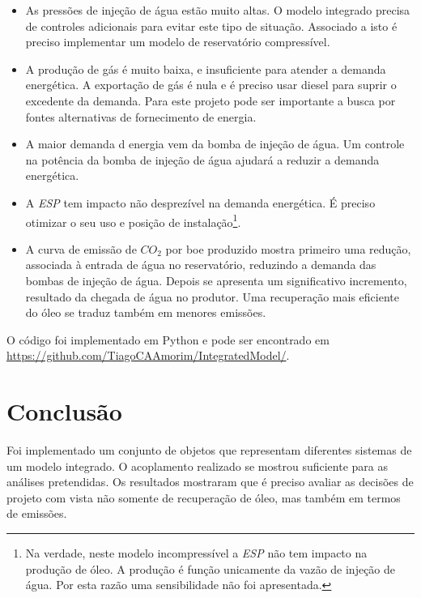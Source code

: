 \documentclass[final,5p]{elsarticle}
\numberwithin{equation}{section}
\begin{document}
        \begin{itemize}
            \item As pressões de injeção de água estão muito altas. O modelo integrado precisa de controles adicionais para evitar este tipo de situação. Associado a isto é preciso implementar um modelo de reservatório compressível.
            \item A produção de gás é muito baixa, e insuficiente para atender a demanda energética. A exportação de gás é nula e é preciso usar diesel para suprir o excedente da demanda. Para este projeto pode ser importante a busca por fontes alternativas de fornecimento de energia.
            \item A maior demanda d energia vem da bomba de injeção de água. Um controle na potência da bomba de injeção de água ajudará a reduzir a demanda energética.
            \item A \emph{ESP} tem impacto não desprezível na demanda energética. É preciso otimizar o seu uso e posição de instalação\footnote{Na verdade, neste modelo incompressível a \emph{ESP} não tem impacto na produção de óleo. A produção é função unicamente da vazão de injeção de água. Por esta razão uma sensibilidade não foi apresentada.}.
            \item A curva de emissão de $CO_2$ por boe produzido mostra primeiro uma redução, associada à entrada de água no reservatório, reduzindo a demanda das bombas de injeção de água. Depois se apresenta um significativo incremento, resultado da chegada de água no produtor. Uma recuperação mais eficiente do óleo se traduz também em menores emissões.
        \end{itemize}

        O código foi implementado em Python e pode ser encontrado em \href{https://github.com/TiagoCAAmorim/IntegratedModel/}{https://github.com/TiagoCAAmorim/IntegratedModel/}.

    \section{Conclusão}
        Foi implementado um conjunto de objetos que representam diferentes sistemas de um modelo integrado. O acoplamento realizado se mostrou suficiente para as análises pretendidas.
        Os resultados mostraram que é preciso avaliar as decisões de projeto com vista não somente de recuperação de óleo, mas também em termos de emissões.

\end{document}

